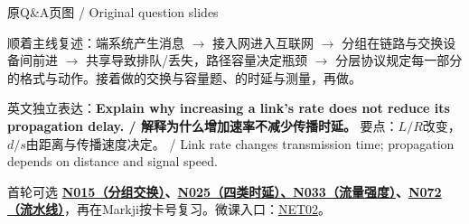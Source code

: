 \begin{StudySolution}{原Q\&A页图 / Original question slides}












\end{StudySolution}





顺着主线复述：端系统产生消息 \ensuremath{\to} 接入网进入互联网 \ensuremath{\to} 分组在链路与交换设备间前进 \ensuremath{\to} 共享导致排队/丢失，路径容量决定瓶颈 \ensuremath{\to} 分层协议规定每一部分的格式与动作。接着做的交换与容量题、的时延与测量，再做。


英文独立表达：\textbf{Explain why increasing a link's rate does not reduce its propagation delay. / 解释为什么增加速率不减少传播时延。} 要点：\(L/R\)改变，\(d/s\)由距离与传播速度决定。 / Link rate changes transmission time; propagation depends on distance and signal speed.


首轮可选 \textbf{\href{https://crazyshout.github.io/micro-course/cards.html\#CS5222-N015}{N015（分组交换）}、\href{https://crazyshout.github.io/micro-course/cards.html\#CS5222-N025}{N025（四类时延）、N033（流量强度）}、\href{https://crazyshout.github.io/micro-course/cards.html\#CS5222-N072}{N072（流水线）}}，再在Markji按卡号复习。微课入口：\href{https://crazyshout.github.io/micro-course/?lesson=net02}{NET02}。




